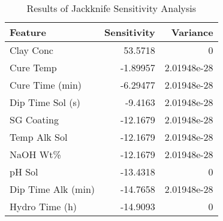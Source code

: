 
    \begin{table*}[h]
        \centering
        \begin{tabular}{lrr}
\hline
 Feature            &   Sensitivity &    Variance \\
\hline
 Clay Conc          &      53.5718  & 0           \\
 Cure Temp          &      -1.89957 & 2.01948e-28 \\
 Cure Time (min)    &      -6.29477 & 2.01948e-28 \\
 Dip Time Sol (s)   &      -9.4163  & 2.01948e-28 \\
 SG Coating         &     -12.1679  & 2.01948e-28 \\
 Temp Alk Sol       &     -12.1679  & 2.01948e-28 \\
 NaOH Wt\%          &     -12.1679  & 2.01948e-28 \\
 pH Sol             &     -13.4318  & 0           \\
 Dip Time Alk (min) &     -14.7658  & 2.01948e-28 \\
 Hydro Time (h)     &     -14.9093  & 0           \\
\hline
\end{tabular}
        \caption{Results of Jackknife Sensitivity Analysis}
        \label{jackknife}
    \end{table*}
    

